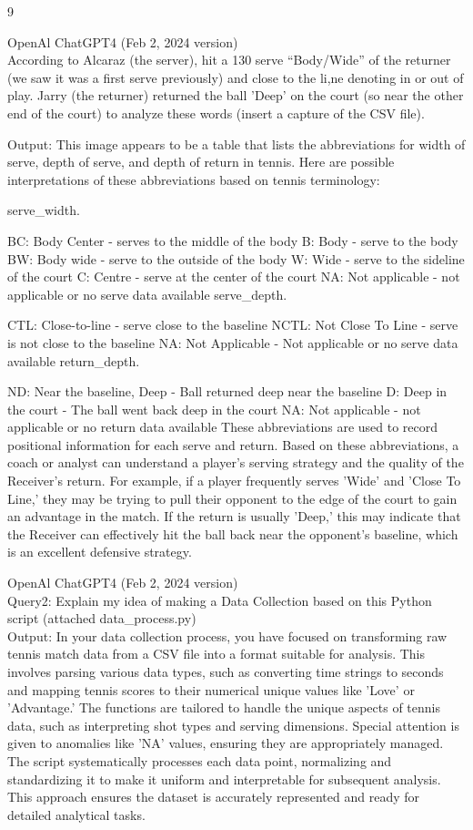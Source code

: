\documentclass{mcmthesis}
\begin{document}
\begin{ReportAiUse}{9}

OpenAl ChatGPT4 (Feb 2, 2024 version)\\
According to Alcaraz (the server), hit a 130 serve “Body/Wide” of the returner (we saw it was a first serve previously) and close to the li,ne denoting in or out of play. Jarry (the returner) returned the ball 'Deep' on the court (so near the other end of the court) to analyze these words (insert a capture of the CSV file).

Output: This image appears to be a table that lists the abbreviations for width of serve, depth of serve, and depth of return in tennis. Here are possible interpretations of these abbreviations based on tennis terminology:

serve\_width.

BC: Body Center - serves to the middle of the body
B: Body - serve to the body
BW: Body wide - serve to the outside of the body
W: Wide - serve to the sideline of the court
C: Centre - serve at the center of the court
NA: Not applicable - not applicable or no serve data available
serve\_depth.

CTL: Close-to-line - serve close to the baseline
NCTL: Not Close To Line - serve is not close to the baseline
NA: Not Applicable - Not applicable or no serve data available
return\_depth.

ND: Near the baseline, Deep - Ball returned deep near the baseline
D: Deep in the court - The ball went back deep in the court
NA: Not applicable - not applicable or no return data available
These abbreviations are used to record positional information for each serve and return. Based on these abbreviations, a coach or analyst can understand a player's serving strategy and the quality of the Receiver's return. For example, if a player frequently serves 'Wide' and 'Close To Line,' they may be trying to pull their opponent to the edge of the court to gain an advantage in the match. If the return is usually 'Deep,' this may indicate that the Receiver can effectively hit the ball back near the opponent's baseline, which is an excellent defensive strategy.

OpenAl ChatGPT4 (Feb 2, 2024 version)\\
Query2: Explain my idea of making a Data Collection based on this Python script (attached data\_process.py)\\
Output: In your data collection process, you have focused on transforming raw tennis match data from a CSV file into a format suitable for analysis. This involves parsing various data types, such as converting time strings to seconds and mapping tennis scores to their numerical unique values like 'Love' or 'Advantage.' The functions are tailored to handle the unique aspects of tennis data, such as interpreting shot types and serving dimensions. Special attention is given to anomalies like 'NA' values, ensuring they are appropriately managed. The script systematically processes each data point, normalizing and standardizing it to make it uniform and interpretable for subsequent analysis. This approach ensures the dataset is accurately represented and ready for detailed analytical tasks.


\end{ReportAiUse}
\end{document}
